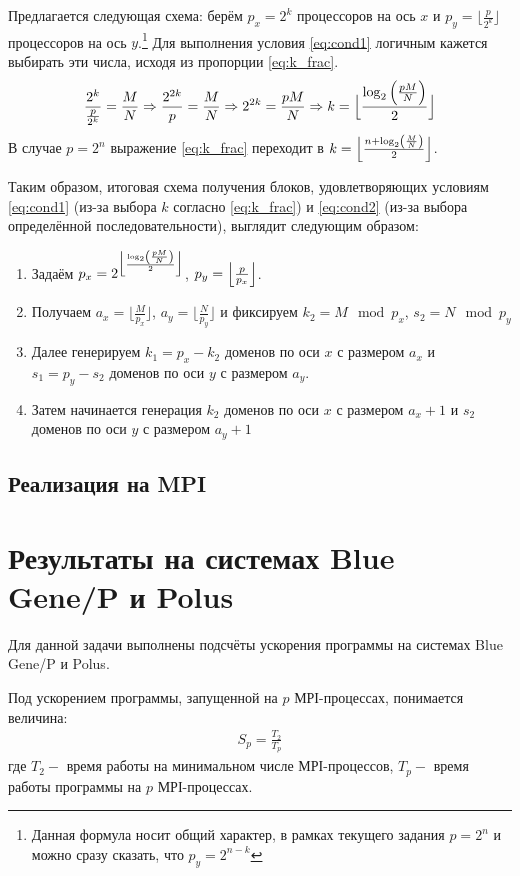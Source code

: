 \documentclass[12pt, fleqn]{article}
\theoremstyle{definition}
\begin{document}
Предлагается следующая схема: берём $p_x = 2^k$ процессоров на ось $x$ и $p_y = \lfloor\frac{p}{2^k}\rfloor$ процессоров на ось $y$.\footnote{Данная формула носит общий характер, в рамках текущего задания $p=2^n$ и можно сразу сказать, что $p_y = 2^{n-k}$} Для выполнения условия \ref{eq:cond1} логичным кажется выбирать эти числа, исходя из пропорции \ref{eq:k_frac}.
\begin{gather}
 \frac{2^k}{\frac{p}{2^k}} = \frac{M}{N} \Rightarrow \frac{2^{2k}}{p} = \frac{M}{N} \Rightarrow 2^{2k} = \frac{pM}{N} \Rightarrow k = \Bigl\lfloor \frac{\log_2\left(\frac{pM}{N}\right)}{2}\Bigr\rfloor \label{eq:k_frac}
\end{gather}
В случае $p=2^n$ выражение \ref{eq:k_frac} переходит в $k = \Bigl\lfloor \frac{n + \log_2\left(\frac{M}{N}\right)}{2}\Bigr\rfloor $.

Таким образом, итоговая схема получения блоков, удовлетворяющих условиям \ref{eq:cond1} (из-за выбора $k$ согласно \ref{eq:k_frac}) и \ref{eq:cond2} (из-за выбора определённой последовательности), выглядит следующим образом:
\begin{enumerate}
 \item Задаём $p_x = 2^{\Bigl\lfloor \frac{\log_2\left(\frac{pM}{N}\right)}{2}\Bigr\rfloor}$, $p_y = \Bigl\lfloor\frac{p}{p_x}\Bigr\rfloor$.
 \item Получаем $a_x = \lfloor \frac{M}{p_x}\rfloor$, $a_y = \lfloor \frac{N}{p_y}\rfloor$ и фиксируем $k_2 = M \mod p_x$, $s_2 = N \mod p_y$
 \item Далее генерируем $k_1 = p_x - k_2$ доменов по оси $x$ с размером $a_x$ и $s_1 = p_y - s_2$ доменов по оси $y$ с размером $a_y$.
 \item Затем начинается генерация $k_2$ доменов по оси $x$ с размером $a_x + 1$ и $s_2$ доменов по оси $y$ с размером $a_y + 1$
\end{enumerate}
\subsection{Реализация на MPI}

\section{Результаты на системах Blue Gene/P и Polus}
Для данной задачи выполнены подсчёты ускорения программы на системах Blue Gene/P и Polus.

Под ускорением программы, запущенной на $p$ МРІ-процессах, понимается величина:
\abovedisplayskip=-1pt
\belowdisplayskip=-1pt
\noindent
\begin{gather*}
S_{p}=\frac{T_{2}}{T_{p}}
\end{gather*}
где $T_{2}-$ время работы на минимальном числе МРІ-процессов, $T_{p}-$ время работы программы на $p$ МРІ-процессах.  
\end{document}

